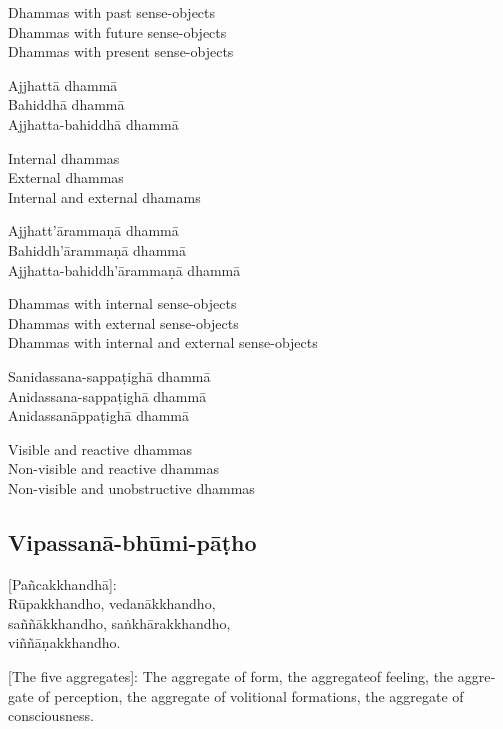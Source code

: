 \begin{english}
  Dhammas with past sense-objects\\
  Dhammas with future sense-objects\\
  Dhammas with present sense-objects
\end{english}

Ajjhattā dhammā\\
Bahiddhā dhammā\\
Ajjhatta-bahiddhā dhammā

\begin{english}
  Internal dhammas\\
  External dhammas\\
  Internal and external dhamams
\end{english}

Ajjhatt’ārammaṇā dhammā\\
Bahiddh’ārammaṇā dhammā\\
Ajjhatta-bahiddh’ārammaṇā dhammā

\begin{english}
  Dhammas with internal sense-objects\\
  Dhammas with external sense-objects\\
  Dhammas with internal and external sense-objects
\end{english}

Sanidassana-sappaṭighā dhammā\\
Anidassana-sappaṭighā dhammā\\
Anidassanāppaṭighā dhammā

\begin{english}
  Visible and reactive dhammas\\
  Non-visible and reactive dhammas\\
  Non-visible and unobstructive dhammas
\end{english}

\suttaRef{[Dhs 1]}

\subsection{Vipassanā-bhūmi-pāṭho}
\label{vipassana-bhumi-patho}
[Pañcakkhandhā]:\\
Rūpakkhandho, vedanākkhandho,\\
saññākkhandho, saṅkhārakkhandho,\\
viññāṇakkhandho.

\begin{english}
  [The five aggregates]: The aggregate of form, the aggregateof feeling, the aggregate of perception, the aggregate of volitional formations, the aggregate of consciousness.
\end{english}

